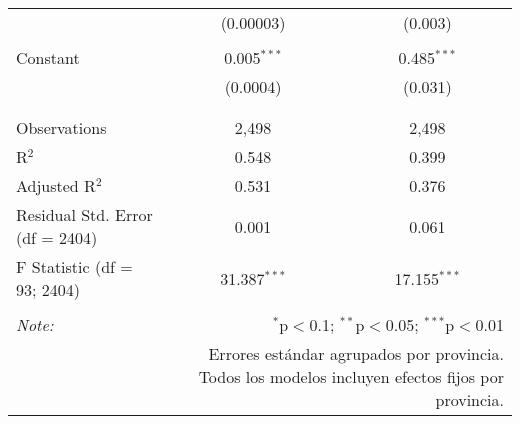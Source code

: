 \begin{table}[ht!]
\begin{tabular}{@{\extracolsep{5pt}}lcc}
  & (0.00003) & (0.003) \\ 
  & & \\ 
 Constant & 0.005$^{***}$ & 0.485$^{***}$ \\ 
  & (0.0004) & (0.031) \\ 
  & & \\ 
\hline \\[-1.8ex] 
Observations & 2,498 & 2,498 \\ 
R$^{2}$ & 0.548 & 0.399 \\ 
Adjusted R$^{2}$ & 0.531 & 0.376 \\ 
Residual Std. Error (df = 2404) & 0.001 & 0.061 \\ 
F Statistic (df = 93; 2404) & 31.387$^{***}$ & 17.155$^{***}$ \\ 
\hline 
\hline \\[-1.8ex] 
\textit{Note:}  & \multicolumn{2}{r}{$^{*}$p$<$0.1; $^{**}$p$<$0.05; $^{***}$p$<$0.01} \\ 
 & \multicolumn{2}{r}{Errores estándar agrupados por provincia. Todos los modelos incluyen efectos fijos por provincia.} \\ 
\end{tabular} 
\end{table} 
